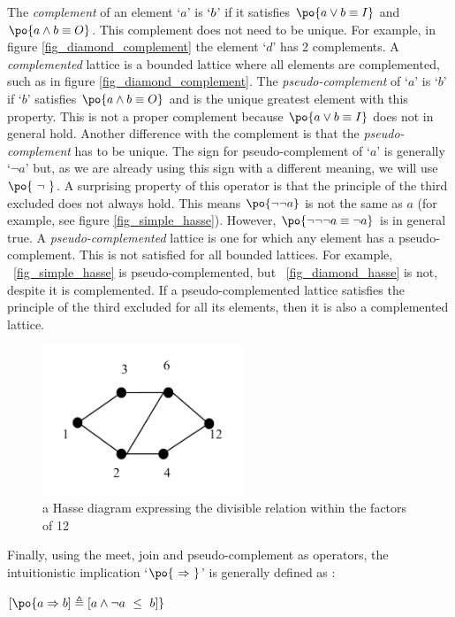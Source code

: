 \documentclass[
		twoside,openright,titlepage,numbers=noenddot,manychapters,
		headinclude,%
                footinclude=false,cleardoublepage=empty,
                BCOR=5mm,
		fontsize=11pt, %
                 enabledeprecatedfontcommands]{scrreprt}
\begin{document}
The \emph{complement} of an element `$a$' is $`b$' if it satisfies $\po{a \vee b \equiv I}$ and $\po{a \wedge b \equiv O}$. This complement does not need to be unique. For example, in figure \ref{fig_diamond_complement} the element `$d$' has 2 complements.  A \emph{complemented} lattice is a bounded lattice where all elements are complemented, such as in figure \ref{fig_diamond_complement}.
The \emph{pseudo-complement} of `$a$' is  `$b$' if `$b$' satisfies $\po{a \wedge b \equiv O} $ and is the unique greatest element with this property.  This is not a proper complement because $\po{a \vee b \equiv I}$ does not in general hold. Another difference with the complement is that the \emph{pseudo-complement} has to be unique. The sign for pseudo-complement of `$a$' is generally `$\neg a$' but, as we are already using this sign with a different meaning, we will use $\po{ \ \neg \ }$.  
A surprising property of this operator is that the principle of the third excluded does not always hold. This means $\po{ \neg \neg a }$ is not the same as $a$ (for example, see figure \ref{fig_simple_hasse}). However, $\po{ \neg \neg \neg a \equiv \neg a }$ is in general true.  
A  \emph{pseudo-complemented} lattice is one for which any element has a pseudo-complement. This is not satisfied for all bounded lattices. For example, ~\ref{fig_simple_hasse} is pseudo-complemented, but  ~\ref{fig_diamond_hasse} is not, despite it is complemented.
If a pseudo-complemented lattice satisfies the principle of the third excluded for all its elements, then it is also a complemented lattice.

\begin{figure}[]

\begin{center}

\includegraphics[width=6cm]{figures/simple_hasse_from12b.jpg}
\caption{a Hasse diagram expressing the divisible relation within the factors of 12 }
\label{fig_simple_hasse12}

\end{center}

\end{figure}
Finally, using the meet, join and pseudo-complement as operators, the intuitionistic implication `$\po{ \ \Rightarrow \ }$' is generally defined as  \cite[]{rutherford1965ilt}: 
\begin{center}
$[\po{ a \Rightarrow  b] \triangleq [a \wedge \neg  a \ \leq \ b ]}$
\end{center}
\end{document}
